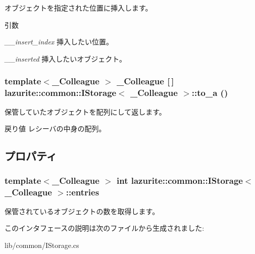 オブジェクトを指定された位置に挿入します。 
\begin{DoxyParams}{引数}
\item[{\em \_\-\_\-insert\_\-index}]挿入したい位置。\item[{\em \_\-\_\-inserted}]挿入したいオブジェクト。\end{DoxyParams}
\hypertarget{interfacelazurite_1_1common_1_1_i_storage_3_01___colleague_01_4_a408c3373a610fb7854b9bcb1d91d2f25}{
\subsubsection[{to\_\-a}]{\setlength{\rightskip}{0pt plus 5cm}template$<$\_\-Colleague $>$ \_\-Colleague \mbox{[}$\,$\mbox{]} lazurite::common::IStorage$<$ \_\-Colleague $>$::to\_\-a ()}}
\label{interfacelazurite_1_1common_1_1_i_storage_3_01___colleague_01_4_a408c3373a610fb7854b9bcb1d91d2f25}


保管していたオブジェクトを配列にして返します。 \begin{DoxyReturn}{戻り値}
レシーバの中身の配列。
\end{DoxyReturn}


\subsection{プロパティ}
\hypertarget{interfacelazurite_1_1common_1_1_i_storage_3_01___colleague_01_4_a107e0a83d66e920b9b6992feed32c4be}{
\subsubsection[{entries}]{\setlength{\rightskip}{0pt plus 5cm}template$<$\_\-Colleague $>$ int lazurite::common::IStorage$<$ \_\-Colleague $>$::entries}}
\label{interfacelazurite_1_1common_1_1_i_storage_3_01___colleague_01_4_a107e0a83d66e920b9b6992feed32c4be}


保管されているオブジェクトの数を取得します。 

このインタフェースの説明は次のファイルから生成されました:\begin{DoxyCompactItemize}
\item 
lib/common/IStorage.cs\end{DoxyCompactItemize}
